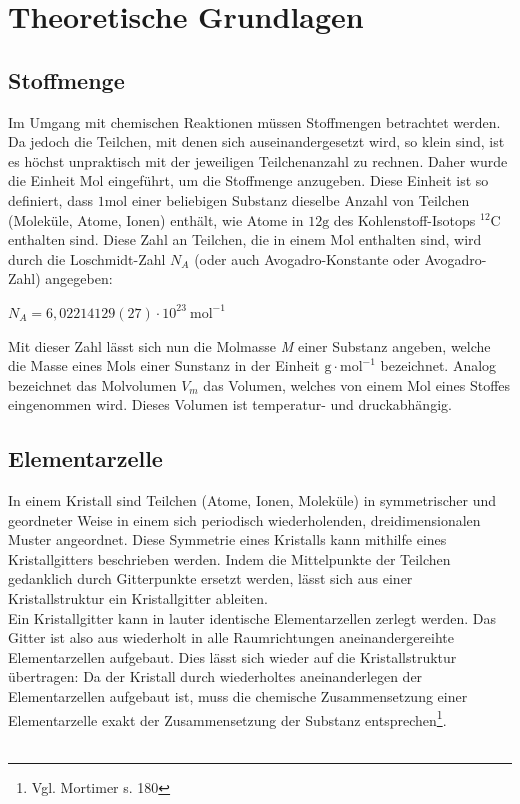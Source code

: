\documentclass[12pt,a4paper,titlepage,headinclude,bibtotoc]{scrartcl}
\begin{document}
\newpage

\section{Theoretische Grundlagen}
\subsection{Stoffmenge}
Im Umgang mit chemischen Reaktionen müssen Stoffmengen betrachtet werden. Da jedoch die Teilchen, mit denen sich auseinandergesetzt wird, so klein sind, ist es höchst unpraktisch mit der jeweiligen Teilchenanzahl zu rechnen. Daher wurde die Einheit Mol eingeführt, um die Stoffmenge anzugeben. Diese Einheit ist so definiert, dass $ \mathrm{1 mol}$ einer beliebigen Substanz dieselbe Anzahl von Teilchen (Moleküle, Atome, Ionen) enthält, wie Atome in $\mathrm{12g}$ des Kohlenstoff-Isotops $\mathrm{^{12}C}$ enthalten sind. Diese Zahl an Teilchen, die in einem Mol enthalten sind, wird durch die Loschmidt-Zahl $N_{A}$ (oder auch Avogadro-Konstante oder Avogadro-Zahl) angegeben:\\

\begin{center}
$N_{A}=6,02214129(27)\cdot 10^{23}\ \mathrm{mol^{-1}}$ 
\end{center}

Mit dieser Zahl lässt sich nun die Molmasse \textit{M} einer Substanz angeben, welche die Masse eines Mols einer Sunstanz in der Einheit $ \mathrm{g \cdot mol^{-1}}$ bezeichnet. Analog bezeichnet das Molvolumen $V_{m}$ das Volumen, welches von einem Mol eines Stoffes eingenommen wird. Dieses Volumen ist temperatur- und druckabhängig.

\subsection{Elementarzelle}
In einem Kristall sind Teilchen (Atome, Ionen, Moleküle) in symmetrischer und geordneter Weise in einem sich periodisch wiederholenden, dreidimensionalen Muster angeordnet. Diese Symmetrie eines Kristalls kann mithilfe eines Kristallgitters beschrieben werden. Indem die Mittelpunkte der Teilchen gedanklich durch Gitterpunkte ersetzt werden, lässt sich aus einer Kristallstruktur ein Kristallgitter ableiten.\\

Ein Kristallgitter kann in lauter identische Elementarzellen zerlegt werden. Das Gitter ist also aus wiederholt in alle Raumrichtungen aneinandergereihte Elementarzellen aufgebaut. Dies lässt sich wieder auf die Kristallstruktur übertragen: Da der Kristall durch wiederholtes aneinanderlegen der Elementarzellen aufgebaut ist, muss die chemische Zusammensetzung einer Elementarzelle exakt der Zusammensetzung der Substanz entsprechen\footnote{Vgl. Mortimer s. 180}.\\\\
\end{document}

